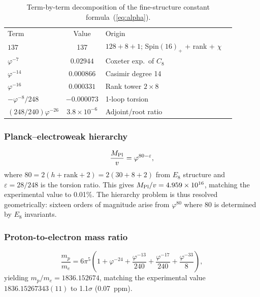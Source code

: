\documentclass[aps,prd,twocolumn,superscriptaddress,nofootinbib,showpacs]{revtex4-2}
\newcommand{\Mpl}{M_{\rm Pl}}
\newcommand{\vev}{v}
\begin{document}
\begin{table}[h]
\caption{\label{tab:alphaterms}Term-by-term decomposition of the
fine-structure constant formula~(\ref{eq:alpha}).}
\begin{ruledtabular}
\begin{tabular}{lcll}
Term & Value & Origin \\
\colrule
$137$ & 137 & $128 + 8 + 1$; Spin$(16)_+$ + rank + $\chi$ \\
$\varphi^{-7}$ & $0.02944$ & Coxeter exp.\ of $C_8$ \\
$\varphi^{-14}$ & $0.000866$ & Casimir degree 14 \\
$\varphi^{-16}$ & $0.000331$ & Rank tower $2\times 8$ \\
$-\varphi^{-8}/248$ & $-0.000073$ & 1-loop torsion \\
$(248/240)\varphi^{-26}$ & $3.8\times10^{-6}$ & Adjoint/root ratio \\
\end{tabular}
\end{ruledtabular}
\end{table}

\subsubsection{Planck--electroweak hierarchy}

\begin{equation}
\frac{\Mpl}{\vev} = \varphi^{80 - \varepsilon},
\label{eq:hierarchy}
\end{equation}
where $80 = 2(h + \text{rank} + 2) = 2(30 + 8 + 2)$ from $E_8$
structure and $\varepsilon = 28/248$ is the torsion ratio.  This gives
$\Mpl/\vev = 4.959 \times 10^{16}$, matching the experimental value
to 0.01\%.  The hierarchy problem is thus resolved geometrically:
sixteen orders of magnitude arise from $\varphi^{80}$ where 80 is
determined by $E_8$ invariants.

\subsubsection{Proton-to-electron mass ratio}

\begin{equation}
\frac{m_p}{m_e} = 6\pi^5\!\left(1 + \varphi^{-24}
+ \frac{\varphi^{-13}}{240} + \frac{\varphi^{-17}}{240}
+ \frac{\varphi^{-33}}{8}\right),
\label{eq:proton}
\end{equation}
yielding $m_p/m_e = 1836.152674$, matching the experimental value
$1836.15267343(11)$ to 1.1$\sigma$ (0.07~ppm).
\end{document}
